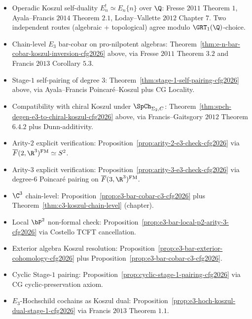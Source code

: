 \begin{itemize}
  \item Operadic Koszul self-duality $E_n^! \simeq E_n\{n\}$ over $\Q$:
        Fresse $2011$ Theorem $1$, Ayala--Francis $2014$ Theorem $2.1$,
        Loday--Vallette $2012$ Chapter $7$. Two independent routes
        (algebraic + topological) agree modulo $\GRT_1(\Q)$-choice.
  \item Chain-level $E_3$ bar-cobar on pro-nilpotent algebras:
        Theorem~\textup{\ref{thm:e-n-bar-cobar-koszul-inversion-cfg2026}}
        above, via Fresse $2011$ Theorem $3.2$ and Francis $2013$
        Corollary $5.3$.
  \item Stage-$1$ self-pairing of degree $3$:
        Theorem~\textup{\ref{thm:stage-1-self-pairing-cfg2026}} above,
        via Ayala--Francis Poincar\'e--Koszul plus CG Locality.
  \item Compatibility with chiral Koszul under $\SpCh_{\Sigma_2, C}$:
        Theorem~\textup{\ref{thm:spch-degen-e3-to-chiral-koszul-cfg2026}}
        above, via Francis--Gaitsgory $2012$ Theorem $6.4.2$ plus
        Dunn-additivity.
  \item Arity-$2$ explicit verification:
        Proposition~\textup{\ref{prop:arity-2-e3-check-cfg2026}} via
        $\overline{F}(2, \R^3)^{\mathrm{FM}} \simeq S^2$.
  \item Arity-$3$ explicit verification:
        Proposition~\textup{\ref{prop:arity-3-e3-check-cfg2026}} via
        degree-$6$ Poincar\'e pairing on
        $\overline{F}(3, \R^3)^{\mathrm{FM}}$.
  \item $\C^3$ chain-level:
        Proposition~\textup{\ref{prop:e3-bar-cobar-c3-cfg2026}} plus
        Theorem~\textup{\ref{thm:c3-koszul-chain-level}} (chapter).
  \item Local $\bP^2$ non-formal check:
        Proposition~\textup{\ref{prop:e3-bar-local-p2-arity-3-cfg2026}}
        via Costello TCFT cancellation.
  \item Exterior algebra Koszul resolution:
        Proposition~\textup{\ref{prop:e3-bar-exterior-cohomology-cfg2026}}
        plus Proposition~\textup{\ref{prop:e3-bar-cobar-c3-cfg2026}}.
  \item Cyclic Stage-$1$ pairing:
        Proposition~\textup{\ref{prop:cyclic-stage-1-pairing-cfg2026}}
        via CG cyclic-preservation axiom.
  \item $E_3$-Hochschild cochains as Koszul dual:
        Proposition~\textup{\ref{prop:e3-hoch-koszul-dual-stage-1-cfg2026}}
        via Francis $2013$ Theorem $1.1$.
\end{itemize}

